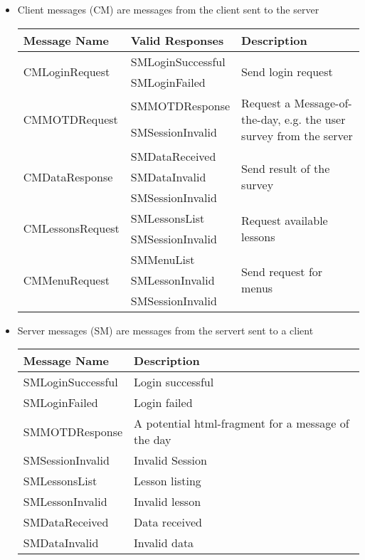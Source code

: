 \documentclass{scrartcl}
\begin{document}
\begin{itemize}
\item Client messages (CM) are messages from the client sent to the server

  \begin{tabular}{llp{}}
    Message Name                      & Valid Responses   & Description \\
    \hline
    \multirow{2}{*}{CMLoginRequest}   & SMLoginSuccessful & \multirow{2}{*}{Send login request} \\
                                      & SMLoginFailed \\
    \hline
    \multirow{2}{*}{CMMOTDRequest}    & SMMOTDResponse    & \multirow{2}{0.6\textwidth}{Request a Message-of-the-day, e.g. the user survey from the server} \\
                                      & SMSessionInvalid \\
    \hline
    \multirow{3}{*}{CMDataResponse}   & SMDataReceived    & \multirow{3}{*}{Send result of the survey} \\
                                      & SMDataInvalid \\
                                      & SMSessionInvalid \\
    \hline
    \multirow{2}{*}{CMLessonsRequest} & SMLessonsList     & \multirow{2}{*}{Request available lessons} \\
                                      & SMSessionInvalid \\
    \hline
    \multirow{3}{*}{CMMenuRequest}    & SMMenuList        & \multirow{3}{*}{Send request for menus} \\
                                      & SMLessonInvalid \\
                                      & SMSessionInvalid \\
  \hline
\end{tabular}

\item Server messages (SM) are messages from the servert sent to a client

  \begin{tabular}{ll}
    Message Name      & Description \\
    \hline
    SMLoginSuccessful & Login successful \\
    SMLoginFailed     & Login failed \\
    SMMOTDResponse    & A potential html-fragment for a message of the day \\
    SMSessionInvalid  & Invalid Session \\
    SMLessonsList     & Lesson listing \\
    SMLessonInvalid   & Invalid lesson \\
    SMDataReceived    & Data received \\
    SMDataInvalid     & Invalid data
  \end{tabular}

\end{itemize}
\end{document}
